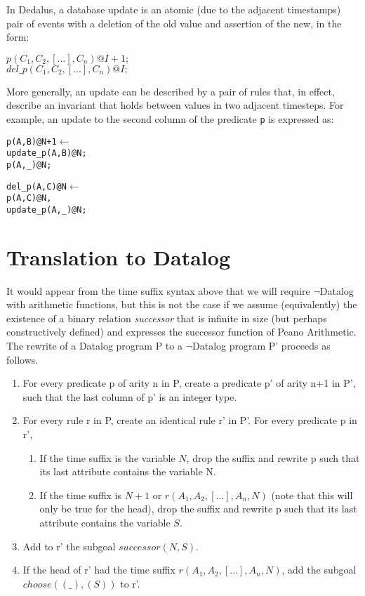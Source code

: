 \documentclass{acm_proc_article-sp-sigmod09}
\newenvironment{Dedalus}{
\vspace{0.5em}\begin{minipage}{0.95\textwidth}%
\begin{alltt}\fontsize{9pt}{9pt}\selectfont}
{\end{alltt}\end{minipage}\vspace{0.5em}}
\newcommand{\dedalus}[1]{\texttt{\fontsize{9pt}{9pt}\selectfont #1}}
\begin{document}
In Dedalus, a database update is an atomic (due to the adjacent timestamps)
pair of events with a deletion of the old value and assertion of the new, in
the form:

$p(C_{1},C_{2},[...],C_{n})@I+1;$
\\
$del\_p(C_{1},C_{2},[...],C_{n})@I;$

More generally, an update can be described by a pair of rules that, in effect,
describe an invariant that holds between values in two adjacent timesteps.
For example, an update to the second column of the predicate \dedalus{p} is
expressed as:

\begin{Dedalus}
p(A, B)@N+1 \(\leftarrow\)
  update_p(A, B)@N;
  p(A, _)@N;
  
del_p(A, C)@N \(\leftarrow\)
  p(A, C)@N,
  update_p(A, _)@N;
\end{Dedalus}

\section{Translation to Datalog}

It would appear from the time suffix syntax above that we will require $\lnot$Datalog with arithmetic functions, but this is not the case if we assume
(equivalently) the existence of a binary relation \emph{successor} that is infinite in size (but perhaps constructively defined) and expresses the 
successor function of Peano Arithmetic.  The rewrite of a Datalog program P to a $\lnot$Datalog program P' proceeds as follows.

\begin{enumerate}
\item For every predicate p of arity n in P, create a predicate p' of arity n+1 in P', such that the last column of p' is an integer type.
\item For every rule r in P, create an identical rule r' in P'.  For every predicate p in r',  
\begin{enumerate}
	\item If the time suffix is the variable $N$, drop the suffix and rewrite p such that its last attribute contains the variable N.
	\item If the time suffix is $N+1$ or $r(A_{1}, A_{2},[...], A_{n},N)$ (note that this will only be true for the head), drop the suffix
	and rewrite p such that its last attribute contains the variable $S$.
\end{enumerate}
\item Add to r' the subgoal $successor(N, S)$.
\item If the head of r' had the time suffix  $r(A_{1}, A_{2},[...], A_{n},N)$, add the subgoal $choose((\_), (S))$ to r'.

\end{enumerate}
\end{document}
